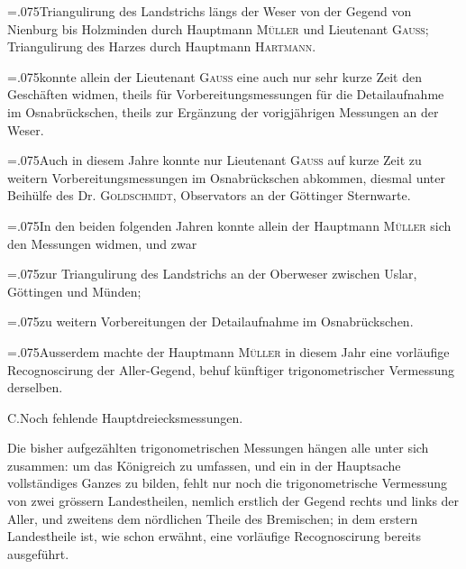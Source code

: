{\hangindent=.075\linewidth{}\noindent{}\enspace Triangulirung des Landstrichs längs der Weser von der Gegend von Nienburg bis Holzminden durch Hauptmann \textsc{Müller} und Lieutenant \textsc{Gauss}; Triangulirung des Harzes durch Hauptmann \textsc{Hartmann}.\par}

{\hangindent=.075\linewidth{}\noindent{}konnte allein der Lieutenant \textsc{Gauss} eine auch nur sehr kurze Zeit den Geschäften widmen, theils für Vorbereitungsmessungen für die Detailaufnahme im Osnabrückschen, theils zur Ergänzung der vorigjährigen Messungen an der Weser.\par}

{\hangindent=.075\linewidth{}\noindent{}\enspace Auch in diesem Jahre konnte nur Lieutenant \textsc{Gauss} auf kurze Zeit zu weitern Vorbereitungsmessungen im Osnabrückschen abkommen, diesmal unter Beihülfe des Dr. \textsc{Goldschmidt}, Observators an der Göttinger Sternwarte.\par}

{\leftskip=.075\linewidth\noindent In den beiden folgenden Jahren konnte allein der Hauptmann \textsc{Müller} sich den Messungen widmen, und zwar\par}

{\hangindent=.075\linewidth{}\noindent{}zur Triangulirung des Landstrichs an der Oberweser zwischen Uslar, Göttingen und Münden;\par}

{\hangindent=.075\linewidth{}\noindent{}zu weitern Vorbereitungen der Detailaufnahme im Osnabrückschen.\par}

{\leftskip=.075\linewidth\noindent Ausserdem machte der Hauptmann \textsc{Müller} in diesem Jahr eine vorläufige Recognoscirung der Aller-Gegend, behuf künftiger trigonometrischer Vermessung derselben.\par}

\begin{center}
C.\quad Noch fehlende Hauptdreiecksmessungen.
\end{center}

\par\noindent\hspace*{\parindent}Die bisher aufgezählten trigonometrischen Messungen hängen alle unter sich zusammen: um das  Königreich zu umfassen, und ein in der Hauptsache vollständiges Ganzes zu bilden, fehlt nur noch die trigonometrische Vermessung von zwei grössern Landestheilen, nemlich erstlich der Gegend rechts und links der Aller, und zweitens dem nördlichen Theile des Bremischen; in dem erstern Landestheile ist, wie schon erwähnt, eine vorläufige Recognoscirung bereits ausgeführt.

